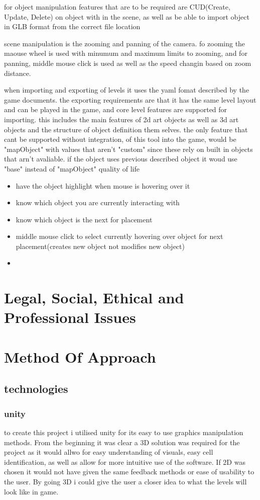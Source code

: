 for object manipulation features that are to be required are CUD(Create, Update, Delete) on object with in the scene, as well as be able to import object in GLB format from the correct file location

scene manipulation is the zooming and panning of the camera. fo zooming the maouse wheel is used with minumum and maximum limits to zooming, and for panning, middle mouse click is used as well as the speed changin based on zoom distance. 

when importing and exporting of levels it uses the yaml fomat described by the game documents. the exporting requirements are that it has the same level layout and can be played in the game, and core level features are supported for importing. this includes the main features of 2d art objects as well as 3d art objects and the structure of object definition them selves. the only feature that cant be supported without integration, of this tool into the game, would be "mapObject" with values that aren't "custom" since these rely on built in objects that arn't avaliable. if the object uses previous described object it woud use "base" instead of "mapObject" 
quality of life
\begin{itemize}
	\item have the object highlight when mouse is hovering over it
	\item know which object you are currently interacting with
	\item know which object is the next for placement
	\item middle mouse click to select currently hovering over object for next placement(creates new object not modifies new object)
	\item 
\end{itemize}

\section{Legal, Social, Ethical and Professional Issues}

\section{Method Of Approach}

\subsection{technologies}
\subsubsection{unity}
to create this project i utilised unity for its easy to use graphics manipulation methods. From the beginning it was clear a 3D solution was required for the project as it would allwo for easy understanding of visuals, easy cell identification, as well as allow for more intuitive use of the software. If 2D was chosen it would not have given the same feedback methods or ease of usability to the user. By going 3D i could give the user a closer idea to what the levels will look like in game.

